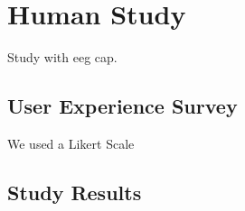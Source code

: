 \chapter{Human Study}\label{ch:human_study}
Study with eeg cap.
\section{User Experience Survey}
We used a Likert Scale \cite{likert1932technique}

\section{Study Results}